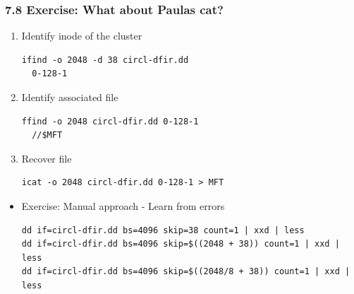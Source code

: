 \begin{frame}[fragile]
  \frametitle{7.8 Exercise: What about Paulas cat?}
    \begin{enumerate}
        \conti
        \item Identify inode of the cluster
        \begin{lstlisting}[basicstyle=\tiny]
ifind -o 2048 -d 38 circl-dfir.dd 
  0-128-1
        \end{lstlisting}

        \item Identify associated file
        \begin{lstlisting}[basicstyle=\tiny]
ffind -o 2048 circl-dfir.dd 0-128-1
  //$MFT
        \end{lstlisting}

        \item Recover file
        \begin{lstlisting}[basicstyle=\tiny]
icat -o 2048 circl-dfir.dd 0-128-1 > MFT
        \end{lstlisting}
    \end{enumerate}
    \begin{itemize}
        \item[] Exercise: Manual approach - Learn from errors
        \begin{lstlisting}[basicstyle=\tiny]
dd if=circl-dfir.dd bs=4096 skip=38 count=1 | xxd | less
dd if=circl-dfir.dd bs=4096 skip=$((2048 + 38)) count=1 | xxd | less
dd if=circl-dfir.dd bs=4096 skip=$((2048/8 + 38)) count=1 | xxd | less
        \end{lstlisting}
        \end{itemize}
\end{frame}



